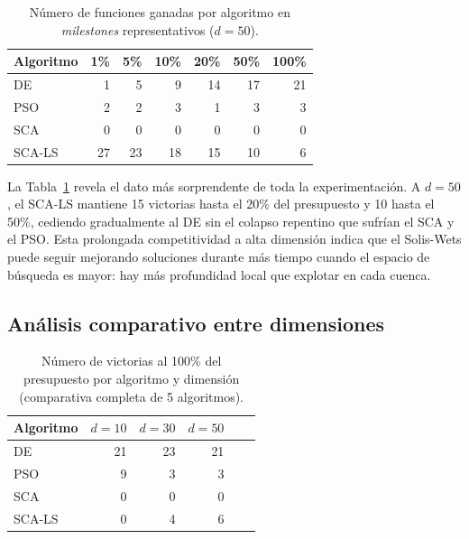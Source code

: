 \documentclass[12pt,a4paper]{article}
\begin{document}
\begin{table}[H]
\centering
\caption{Número de funciones ganadas por algoritmo en \textit{milestones} representativos ($d=50$).}
\label{tab:resumen_victorias_sca_ls_d50}
\renewcommand{\arraystretch}{1.2}
\begin{tabular}{lrrrrrr}
\toprule
\textbf{Algoritmo} & \textbf{1\%} & \textbf{5\%} & \textbf{10\%} & \textbf{20\%} & \textbf{50\%} & \textbf{100\%} \\
\midrule
DE      &  1 &  5 &  9 & 14 & 17 & 21 \\
PSO     &  2 &  2 &  3 &  1 &  3 &  3 \\
SCA     &  0 &  0 &  0 &  0 &  0 &  0 \\
SCA-LS  & 27 & 23 & 18 & 15 & 10 &  6 \\
\bottomrule
\end{tabular}
\end{table}

La Tabla~\ref{tab:resumen_victorias_sca_ls_d50} revela el dato más sorprendente de toda la experimentación. A $d=50$, el SCA-LS mantiene 15 victorias hasta el 20\% del presupuesto y 10 hasta el 50\%, cediendo gradualmente al DE sin el colapso repentino que sufrían el SCA y el PSO. Esta prolongada competitividad a alta dimensión indica que el Solis-Wets puede seguir mejorando soluciones durante más tiempo cuando el espacio de búsqueda es mayor: hay más profundidad local que explotar en cada cuenca.

\subsection{Análisis comparativo entre dimensiones}

\begin{table}[H]
\centering
\caption{Número de victorias al 100\% del presupuesto por algoritmo y dimensión (comparativa completa de 5 algoritmos).}
\label{tab:comparativa_dims_sca_ls}
\renewcommand{\arraystretch}{1.2}
\begin{tabular}{lrrrrr}
\toprule
\textbf{Algoritmo} & $d=10$ & $d=30$ & $d=50$ \\
\midrule
DE      & 21 & 23 & 21 \\
PSO     &  9 &  3 &  3 \\
SCA     &  0 &  0 &  0 \\
SCA-LS  &  0 &  4 &  6 \\
\bottomrule
\end{tabular}
\end{table}
\end{document}
